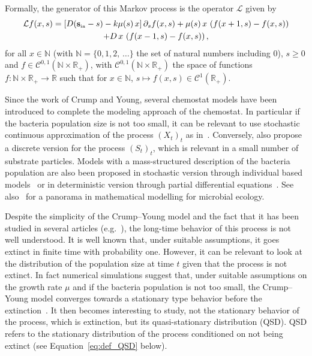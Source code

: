 \documentclass[AHL,Unicode,longabstracts,published]{cedram}
\newcommand{\RR}{\mathbb{R}}
\newcommand{\NN}{\mathbb{N}}
\newcommand{\clL}{\mathcal{L}}
\newcommand{\clC}{\mathcal{C}}
\newcommand{\Sin}{{\mathbf s}_{\textrm{\tiny\rm in}}}
\newcommand{\1}{\mathbf{1}}
\begin{document}

Formally, the generator of this Markov process is the operator $\clL$ given by
\begin{multline}\label{eq:generator}
\clL f(x,s) = \left[D(\Sin-s) - k \mu(s)\,x\right] \partial_s f(x,s) + \mu(s)\, x\, \left(f(x+1,s)-f(x,s)\right)\\
+ D \,x\,\left(f(x-1,s)-f(x,s)\right),
\end{multline}
for all $x\in\NN$ (with $\NN=\{0,1,2,\,\dots\}$ the set of natural numbers including 0), $s\geq 0$ and $f\in\clC^{0,1}(\NN\times \RR_+)$, with $\clC^{0,1}(\NN\times \RR_+)$ the space of functions $f:\NN\times \RR_+ \to \RR$ such that for $x\in\NN$, $s\mapsto f(x,s)\in \clC^{1}(\RR_+)$.

Since the work of Crump and Young, several chemostat models have been introduced to complete the modeling approach of the chemostat. In particular if the bacteria population size is not too small, it can be relevant to use stochastic continuous approximation of the process $(X_t)_t$ as in~\cite{CF17,CJL11, FRRS}. Conversely, \cite{CJL11} also propose a discrete version for the process $(S_t)_t$, which is relevant in a small number of substrate particles. Models with a mass-structured description of the bacteria population are also been proposed in stochastic version through individual based models~\cite{CF15,FHC} or in deterministic version through partial differential equations~\cite{fredrickson1967a, ramkrishna1979a}. See also~\cite{W16} for a panorama in mathematical modelling for microbial ecology.

Despite the simplicity of the Crump--Young model and the fact that it has been studied in several articles (e.g.~\cite{CF17, CJL11,CMMS,CY79,W16}), the long-time behavior of this process is not well understood. It is well known that, under suitable assumptions, it goes extinct in finite time with probability one. However, it can be relevant to look at the distribution of the population size at time $t$ given that the process is not extinct. In fact numerical simulations suggest that, under suitable assumptions on the growth rate $\mu$ and if the bacteria population is not too small, the Crump--Young model converges towards a stationary type behavior before the extinction~\cite{CF17}. It then becomes interesting to study, not the stationary behavior of the process, which is extinction, but its quasi-stationary distribution (QSD). QSD refers to the stationary distribution of the process conditioned on not being extinct (see Equation~\eqref{eq:def_QSD} below).
\end{document}

